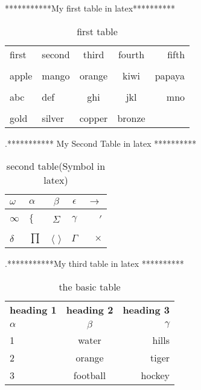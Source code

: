 \documentclass[12pt]{article}
\begin{document}
***********My first table in latex**********
\begin{table}[h]
\caption{first table}
\hline
\centering
\begin{tabular}{l l c c r}
first  &  second  &  third  &  fourth  &  fifth \\ \\
apple  &  mango   &  orange &  kiwi    &  papaya \\ \\
abc    &  def     &  ghi    &  jkl     &  mno \\ \\
gold   &  silver  &  copper &  bronze 
\end{tabular}
\end{table}

.*********** My Second Table in latex **********
\begin{table}[h]
\caption{second table(Symbol in latex)}
\centering
\begin{tabular}{|l|l|c|c|r|} \hline
\hline 
$\omega$  &  $\alpha$  &  $\beta$  &  $\epsilon$  &  $\rightarrow$ \\ \hline \hline\\
$\infty$  &  $\lbrace$  & $\Sigma$  &  $\gamma$    &  $'$      \\ \hline \hline \\
$\delta$  &  $\prod$   &  $\langle$ $\rangle$  &  $\Gamma$  &  $\times $ \\ \hline 
\end{tabular}
\end{table} 

.***********My third table in latex **********
\begin{table}[h]
\caption{the basic table}
\centering
\begin{tabular}{|l||c|r|}
\textbf{heading 1} & \textbf{heading 2} & \textbf{heading 3} \\ \cline{2-3}
$\alpha$  &  $\beta$  &  $\gamma$ \\ \hline 
1         &  water    &  hills  \\ 
2         &  orange   &  tiger  \\ \cline{1-1}
3         &  football &  hockey \\\cline{1-2}
\end{tabular}

\end{table}
\end{document}

